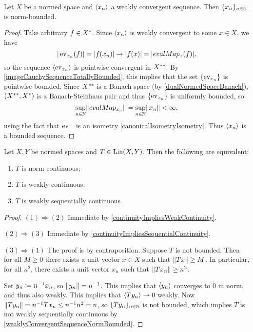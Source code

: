 \begin{proposition} \label{weaklyConvergentSequenceNormBounded}
Let $X$ be a normed space and $\left\langle x_n \right\rangle$ a weakly convergent sequence. Then $\{x_n\}_{n\in \mathbb{N}}$ is norm-bounded.
\end{proposition}
\begin{proof}
Take arbitrary $f\in {X}^*$. Since $\left\langle x_n \right\rangle$ is weakly convergent to some $x\in X$, we have
\[ |\operatorname{ev}_{x_n}(f)| = |f(x_n)| \to |f(x)| = |evalMap_x(f)|, \]
so the sequence $\left\langle \operatorname{ev}_{x_n} \right\rangle$ is pointwise convergent in ${X}^{**}$. By \ref{imageCauchySequenceTotallyBounded}, this implies that the set $\{\operatorname{ev}_{x_n}\}$ is pointwise bounded. Since ${X}^{**}$ is a Banach space (by \ref{dualNormedSpaceBanach}), $({X}^{**}, {X}^*)$ is a Banach-Steinhaus pair and thus $\{\operatorname{ev}_{x_n}\}$ is uniformly bounded, so
\[ \sup_{n\in \mathbb{N}}\lVert evalMap_{x_n}\rVert = \sup_{n\in \mathbb{N}}\lVert x_n\rVert < \infty, \]
using the fact that $\operatorname{ev}_-$ is an isometry \ref{canonicalIsometryIsometry}. Thus $\left\langle x_n \right\rangle$ is a bounded sequence.
\end{proof}

\begin{proposition}
Let $X,Y$ be normed spaces and $T\in \operatorname{Lin}(X,Y)$. Then the following are equivalent:
\begin{enumerate}
\item $T$ is norm continuous;
\item $T$ is weakly continuous;
\item $T$ is weakly sequentially continuous.
\end{enumerate}
\end{proposition}
\begin{proof}
$(1) \Rightarrow (2)$ Immediate by \ref{continuityImpliesWeakContinuity}.

$(2) \Rightarrow (3)$ Immediate by \ref{continuityImpliesSequentialContinuity}.

$(3) \Rightarrow (1)$ The proof is by contraposition. Suppose $T$ is not bounded. Then for all $M\geq 0$ there exists a unit vector $x\in X$ such that $\lVert Tx\rVert \geq M$. In particular, for all $n^2$, there exists a unit vector $x_n$ such that $\lVert Tx_n\rVert \geq n^2$.

Set $y_n \coloneqq n^{-1}x_n$, so $\lVert y_n\rVert = n^{-1}$. This implies that $\left\langle y_n \right\rangle$ converges to $0$ in norm, and thus also weakly. This implies that $\left\langle Ty_n \right\rangle \to 0$ weakly. Now $\lVert Ty_n\rVert = n^{-1}Tx_n \leq n^{-1}n^2 = n$, so $\{Ty_n\}_{n\in\mathbb{N}}$ is not bounded, which implies $T$ is not weakly sequentially continuous by \ref{weaklyConvergentSequenceNormBounded}.
\end{proof}

